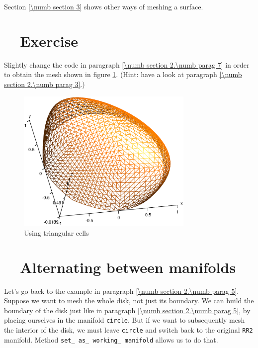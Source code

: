 Section \ref{\numb section 3} shows other ways of meshing a surface.


\section{~~Exercise}\label{\numb section 2.\numb parag 8}

Slightly change the code in paragraph \ref{\numb section 2.\numb parag 7}
in order to obtain the mesh shown in figure \ref{\numb section 2.\numb fig 8}.
(Hint: have a look at paragraph \ref{\numb section 2.\numb parag 3}.)

\begin{figure}[ht] \centering
  \includegraphics[width=85mm]{hemisphere-1}
  \caption{Using triangular cells}
  \label{\numb section 2.\numb fig 8}
\end{figure}


\section{~~Alternating between manifolds}\label{\numb section 2.\numb parag 9}

Let's go back to the example in paragraph \ref{\numb section 2.\numb parag 5}.
Suppose we want to mesh the whole disk, not just its boundary.
We can build the boundary of the disk just like in paragraph
\ref{\numb section 2.\numb parag 5}, by placing ourselves in the manifold {\small\tt circle}.
But if we want to subsequently mesh the interior of the disk, we must leave {\small\tt circle}
and switch back to the original {\small\tt RR2} manifold.
Method {\small\tt set\_\,as\_\,working\_\,manifold} allows us to do that.

